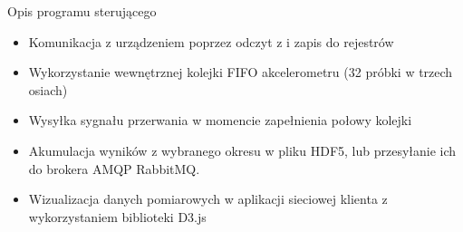 \documentclass[aspectratio=1610,polish]{beamer} %
\begin{document}
  \begin{frame}{Opis programu sterującego}
      \begin{itemize}
        \item Komunikacja z urządzeniem poprzez odczyt z i zapis do rejestrów
        \item Wykorzystanie wewnętrznej kolejki FIFO akcelerometru (32 próbki w trzech osiach)
        \item Wysyłka sygnału przerwania w momencie zapełnienia połowy kolejki
        \item Akumulacja wyników z wybranego okresu w pliku HDF5, lub
	  przesyłanie ich do brokera AMQP RabbitMQ.
	\item Wizualizacja danych pomiarowych w aplikacji sieciowej klienta z
	  wykorzystaniem biblioteki D3.js
      \end{itemize}
  \end{frame}
  
\end{document}
